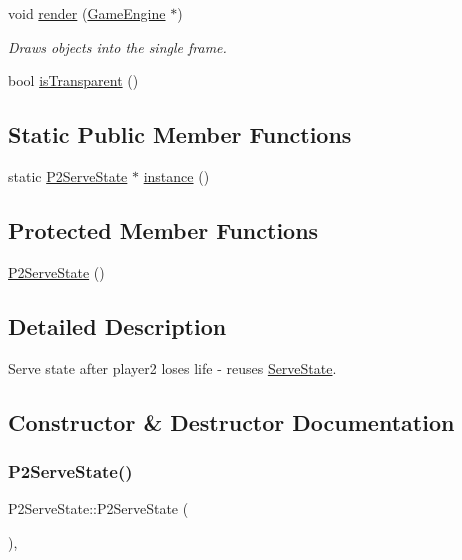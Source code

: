 \begin{DoxyCompactItemize}
void \mbox{\hyperlink{class_p2_serve_state_acc6d131c7a5712a643b7f97c3bcdbd46}{render}} (\mbox{\hyperlink{class_game_engine}{Game\+Engine}} $\ast$)
\begin{DoxyCompactList}\small\item\em Draws objects into the single frame. \end{DoxyCompactList}\item 
bool \mbox{\hyperlink{class_p2_serve_state_a60e2072a070c980f8c9b9365a83041fd}{is\+Transparent}} ()
\end{DoxyCompactItemize}
\subsection*{Static Public Member Functions}
\begin{DoxyCompactItemize}
\item 
static \mbox{\hyperlink{class_p2_serve_state}{P2\+Serve\+State}} $\ast$ \mbox{\hyperlink{class_p2_serve_state_ab33721553cd862745bb721fcab45b104}{instance}} ()
\end{DoxyCompactItemize}
\subsection*{Protected Member Functions}
\begin{DoxyCompactItemize}
\item 
\mbox{\hyperlink{class_p2_serve_state_acccff2bfe7954976860ee348d745c3ee}{P2\+Serve\+State}} ()
\end{DoxyCompactItemize}


\subsection{Detailed Description}
Serve state after player2 loses life -\/ reuses \mbox{\hyperlink{class_serve_state}{Serve\+State}}. 

\subsection{Constructor \& Destructor Documentation}
\mbox{\label{class_p2_serve_state_acccff2bfe7954976860ee348d745c3ee}} 
\subsubsection{\texorpdfstring{P2ServeState()}{P2ServeState()}}
{\footnotesize\ttfamily P2\+Serve\+State\+::\+P2\+Serve\+State (\begin{DoxyParamCaption}{ }\end{DoxyParamCaption})\hspace{0.3cm}{\ttfamily [inline]}, {\ttfamily [protected]}}



